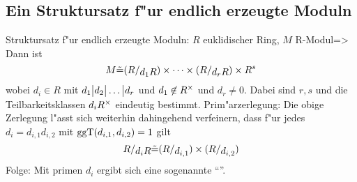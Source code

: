\subsection{Ein Struktursatz f"ur endlich erzeugte Moduln}
\theorem Struktursatz f"ur endlich erzeugte Moduln:
  $R$ euklidischer Ring, $M$ R-Modul=>{
  Dann ist 
  \[M\tilde =
    (\rcoset R {d_1 R}) \times \cdots \times (\rcoset R {d_r R})\times R^s
    \]
  wobei $d_i\in R$ mit $d_1\big| d_2\big| \ldots \big| d_r$ und
  $d_1\not\in R^\times$ und $d_r\ne 0$. Dabei sind $r,s$ und die
  Teilbarkeitsklassen $d_iR^\times$ eindeutig bestimmt.
  }
\remark Prim"arzerlegung:{
  Die obige Zerlegung l"asst sich weiterhin dahingehend verfeinern, dass
  f"ur jedes $d_i=d_{i,1}d_{i,2}$ mit $\operatorname{ggT}(d_{i,1},d_{i,2})=1$ 
  gilt
  \[\rcoset R{d_iR}\tilde = (\rcoset R{d_{i,1}})\times (\rcoset R{d_{i,2}})
    \]
  Folge: Mit primen $d_i$ ergibt sich eine sogenannte 
  ``''.
  }
 